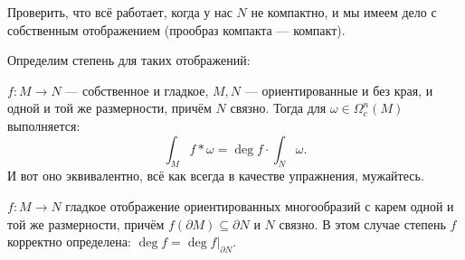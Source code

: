 Проверить, что всё работает, когда у нас $N$ не компактно, и мы имеем дело с собственным отображением (прообраз компакта --- компакт).

Определим степень для таких отображений:
\begin{to_def}
	$f \colon M \rightarrow N$ --- собственное и гладкое, $M,N$ --- ориентированные и без края, и одной и той же размерности, причём $N$ связно. Тогда для $\omega \in \Omega_c^n (M)$ выполняется:
\begin{equation*}
	\int_{M} f* \omega = \deg f \cdot \int_{N} \omega.
\end{equation*}	
И вот оно эквивалентно, всё как всегда в качестве упражнения, мужайтесь.
\end{to_def}

\begin{to_lem}
	$f \colon M\rightarrow N$ гладкое отображение ориентированных многообразий с карем одной и той же размерности, причём $f(\partial M) \subseteq \partial N$ и $N$ связно. В этом случае степень $f$ корректно определена: $\deg f = \deg f |_{\partial N} $.
\end{to_lem}